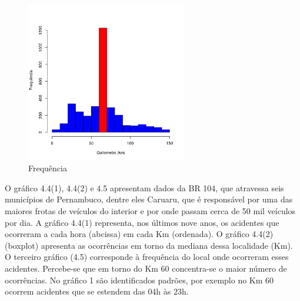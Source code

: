 \quad \quad
\begin{figure}[h]
	\centering
	\caption{ Frequência}
	\includegraphics[width=7cm,height=7cm]{Figuras/Preprocess/br104_3.png}
\end{figure}

O gráfico 4.4(1), 4.4(2) e 4.5 apresentam dados da BR 104, que atravessa seis municípios de Pernambuco, dentre eles Caruaru, que é responsável por uma das maiores frotas de veículos do interior e por onde passam cerca de 50 mil veículos por dia. 
A gráfico 4.4(1) representa, nos últimos nove anos, os acidentes que ocorreram a cada hora (abcissa) em cada Km (ordenada).
O  gráfico 4.4(2) (boxplot) apresenta as ocorrências em torno da mediana dessa localidade (Km).
O terceiro gráfico (4.5) corresponde à frequência do local onde ocorreram esses acidentes. 
Percebe-se que em torno do Km 60 concentra-se o maior número de ocorrências. 
No gráfico 1 são identificados padrões, por exemplo no Km 60 ocorrem acidentes que se estendem das 04h às 23h. 



